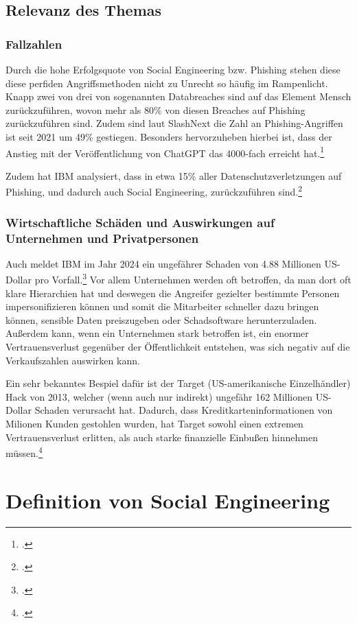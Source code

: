 \documentclass[12pt, a4paper, oneside]{scrartcl}
\begin{document}
\subsection{Relevanz des Themas}

\subsubsection{Fallzahlen}
Durch die hohe Erfolgsquote von Social Engineering bzw. Phishing stehen diese diese perfiden 
Angriffsmethoden nicht zu Unrecht so häufig im Rampenlicht. Knapp zwei von drei von sogenannten 
Databreaches sind auf das Element Mensch zurückzuführen, wovon mehr als 80\% von diesen Breaches
auf Phishing zurückzuführen sind. Zudem sind laut SlashNext die Zahl an Phishing-Angriffen ist
seit 2021 um 49\% gestiegen. Besonders hervorzuheben hierbei ist, dass der Anstieg mit der 
Veröffentlichung von ChatGPT das 4000-fach erreicht hat.\footcite{HoxHunt_Report}
\par
Zudem hat IBM analysiert, dass in etwa 15\% aller Datenschutzverletzungen auf Phishing, und
dadurch auch Social Engineering, zurückzuführen sind.\footcite{IBM_Report}

\subsubsection{Wirtschaftliche Schäden und Auswirkungen auf Unternehmen und Privatpersonen}
Auch meldet IBM im Jahr 2024 ein ungefährer Schaden von 4.88 Millionen US-Dollar pro Vorfall.\footcite{IBM_Phishing}
Vor allem Unternehmen werden oft betroffen, da man dort oft klare Hierarchien hat und deswegen
die Angreifer gezielter bestimmte Personen impersonifizieren können und somit die Mitarbeiter
schneller dazu bringen können, sensible Daten preiszugeben oder Schadsoftware herunterzuladen.
Außerdem kann, wenn ein Unternehmen stark betroffen ist, ein enormer Vertrauensverlust gegenüber
der Öffentlichkeit entstehen, was sich negativ auf die Verkaufszahlen auswirken kann.
\par
Ein sehr bekanntes Bespiel dafür ist der Target (US-amerikanische Einzelhändler) Hack von 2013,
welcher (wenn auch nur indirekt) ungefähr 162 Millionen US-Dollar Schaden verursacht hat. Dadurch,
dass Kreditkarteninformationen von Milionen Kunden gestohlen wurden, hat Target sowohl einen extremen
Vertrauensverlust erlitten, als auch starke finanzielle Einbußen hinnehmen müssen.\footcite{Target_Breach}\\

\section{Definition von Social Engineering}
\end{document}
